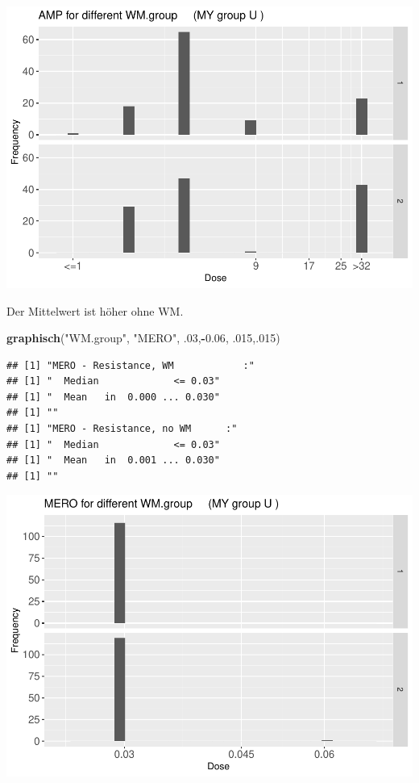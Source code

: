 \documentclass[
]{article}
\newenvironment{Shaded}{\begin{snugshade}}{\end{snugshade}}
\newcommand{\DecValTok}[1]{\textcolor[rgb]{0.00,0.00,0.81}{#1}}
\newcommand{\FloatTok}[1]{\textcolor[rgb]{0.00,0.00,0.81}{#1}}
\newcommand{\KeywordTok}[1]{\textcolor[rgb]{0.13,0.29,0.53}{\textbf{#1}}}
\newcommand{\NormalTok}[1]{#1}
\newcommand{\OperatorTok}[1]{\textcolor[rgb]{0.81,0.36,0.00}{\textbf{#1}}}
\newcommand{\StringTok}[1]{\textcolor[rgb]{0.31,0.60,0.02}{#1}}
\begin{document}
\includegraphics{Verteilungen_files/figure-latex/unnamed-chunk-31-1.pdf}

Der Mittelwert ist höher ohne WM.

\begin{Shaded}
\begin{Highlighting}[]
  \KeywordTok{graphisch}\NormalTok{(}\StringTok{"WM.group"}\NormalTok{, }\StringTok{"MERO"}\NormalTok{, }\FloatTok{.03}\NormalTok{,}\OperatorTok{-}\FloatTok{0.06}\NormalTok{, }\FloatTok{.015}\NormalTok{,.}\DecValTok{015}\NormalTok{)}
\end{Highlighting}
\end{Shaded}

\begin{verbatim}
## [1] "MERO - Resistance, WM            :"
## [1] "  Median             <= 0.03"
## [1] "  Mean   in  0.000 ... 0.030"
## [1] ""
## [1] "MERO - Resistance, no WM      :"
## [1] "  Median             <= 0.03"
## [1] "  Mean   in  0.001 ... 0.030"
## [1] ""
\end{verbatim}

\includegraphics{Verteilungen_files/figure-latex/unnamed-chunk-32-1.pdf}
\end{document}
